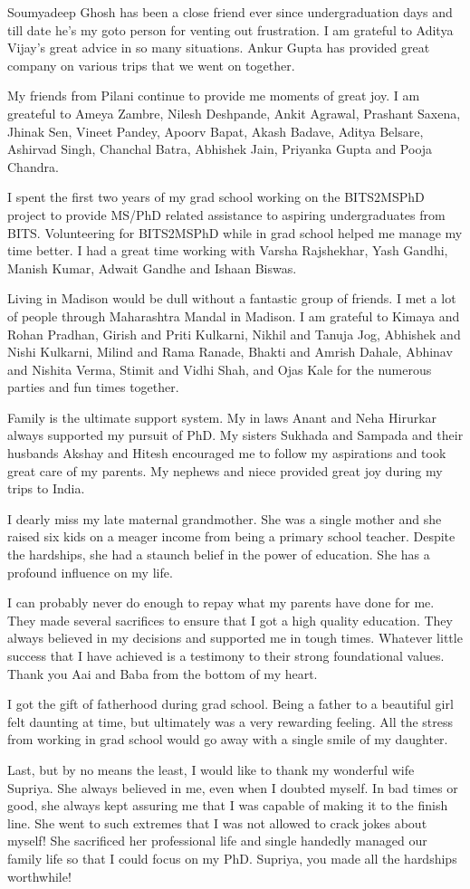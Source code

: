Soumyadeep Ghosh has been a close friend ever since undergraduation days and till date he's my goto person for venting out frustration. 
I am grateful to Aditya Vijay's great advice in so many situations.
Ankur Gupta has provided great company on various trips that we went on together.

My friends from Pilani continue to provide me moments of great joy.
I am greateful to Ameya Zambre, Nilesh Deshpande, Ankit Agrawal, Prashant Saxena, Jhinak Sen, Vineet Pandey, Apoorv Bapat, Akash Badave, Aditya Belsare, Ashirvad Singh, Chanchal Batra, Abhishek Jain, Priyanka Gupta and Pooja Chandra.

I spent the first two years of my grad school working on the BITS2MSPhD project to provide MS/PhD related assistance to aspiring undergraduates from BITS. 
Volunteering for BITS2MSPhD while in grad school helped me manage my time better.
I had a great time working with Varsha Rajshekhar, Yash Gandhi, Manish Kumar, Adwait Gandhe and Ishaan Biswas. 

Living in Madison would be dull without a fantastic group of friends.
I met a lot of people through Maharashtra Mandal in Madison. 
I am grateful to Kimaya and Rohan Pradhan, Girish and Priti Kulkarni, Nikhil and Tanuja Jog, Abhishek and Nishi Kulkarni, Milind and Rama Ranade, Bhakti and Amrish Dahale, Abhinav and Nishita Verma, Stimit and Vidhi Shah, and Ojas Kale for the numerous parties and fun times together. 

Family is the ultimate support system. 
My in laws Anant and Neha Hirurkar always supported my pursuit of PhD. 
My sisters Sukhada and Sampada and their husbands Akshay and Hitesh encouraged me to follow my aspirations and took great care of my parents.
My nephews and niece provided great joy during my trips to India.

I dearly miss my late maternal grandmother. 
She was a single mother and she raised six kids on a meager income from being a primary school teacher.
Despite the hardships, she had a staunch belief in the power of education.
She has a profound influence on my life.

I can probably never do enough to repay what my parents have done for me. 
They made several sacrifices to ensure that I got a high quality education. 
They always believed in my decisions and supported me in tough times.
Whatever little success that I have achieved is a testimony to their strong foundational values.
Thank you Aai and Baba from the bottom of my heart.

I got the gift of fatherhood during grad school.
Being a father to a beautiful girl felt daunting at time, but ultimately was a very rewarding feeling.
All the stress from working in grad school would go away with a single smile of my daughter.

Last, but by no means the least, I would like to thank my wonderful wife Supriya. 
She always believed in me, even when I doubted myself. 
In bad times or good, she always kept assuring me that I was capable of making it to the finish line. 
She went to such extremes that I was not allowed to crack jokes about myself! 
She sacrificed her professional life and single handedly managed our family life so that I could focus on my PhD. 
Supriya, you made all the hardships worthwhile! 
